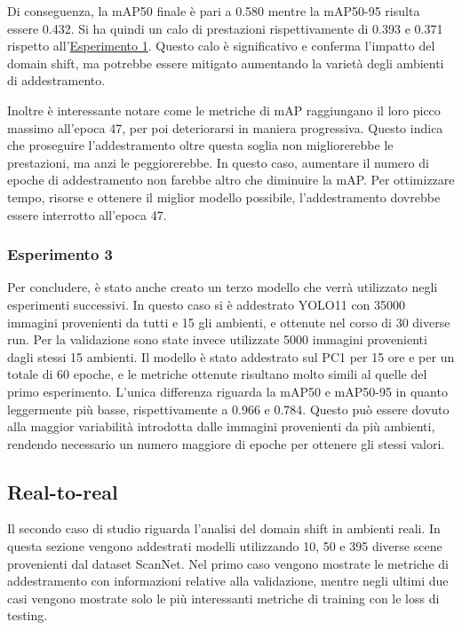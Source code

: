 \documentclass[12pt]{report}
\begin{document}
Di conseguenza, la mAP50 finale è pari a 0.580 mentre la mAP50-95 risulta essere 0.432. Si ha quindi un calo di prestazioni rispettivamente di 0.393 e 0.371 rispetto all'\hyperref[sec:esperimento_1]{Esperimento 1}. Questo calo è significativo e conferma l'impatto del domain shift, ma potrebbe essere mitigato aumentando la varietà degli ambienti di addestramento.

Inoltre è interessante notare come le metriche di mAP raggiungano il loro picco massimo all'epoca 47, per poi deteriorarsi in maniera progressiva. Questo indica che proseguire l'addestramento oltre questa soglia non migliorerebbe le prestazioni, ma anzi le peggiorerebbe.  In questo caso, aumentare il numero di epoche di addestramento non farebbe altro che diminuire la mAP. Per ottimizzare tempo, risorse e ottenere il miglior modello possibile, l'addestramento dovrebbe essere interrotto all'epoca 47.

\subsubsection{Esperimento 3}
\label{sec:esperimento_3}

Per concludere, è stato anche creato un terzo modello che verrà utilizzato negli esperimenti successivi. In questo caso si è addestrato YOLO11 con 35000 immagini provenienti da tutti e 15 gli ambienti, e ottenute nel corso di 30 diverse run. Per la validazione sono state invece utilizzate 5000 immagini provenienti dagli stessi 15 ambienti. Il modello è stato addestrato sul PC1 per 15 ore e per un totale di 60 epoche, e le metriche ottenute risultano molto simili al quelle del primo esperimento. L'unica differenza riguarda la mAP50 e mAP50-95 in quanto leggermente più basse, rispettivamente a 0.966 e 0.784. Questo può essere dovuto alla maggior variabilità introdotta dalle immagini provenienti da più ambienti, rendendo necessario un numero maggiore di epoche per ottenere gli stessi valori.

\subsection{Real-to-real}
\label{sec:real_to_real}

Il secondo caso di studio riguarda l'analisi del domain shift in ambienti reali. In questa sezione vengono addestrati modelli utilizzando 10, 50 e 395 diverse scene provenienti dal dataset ScanNet. Nel primo caso vengono mostrate le metriche di addestramento con informazioni relative alla validazione, mentre negli ultimi due casi vengono mostrate solo le più interessanti metriche di training con le loss di testing.
\end{document}
